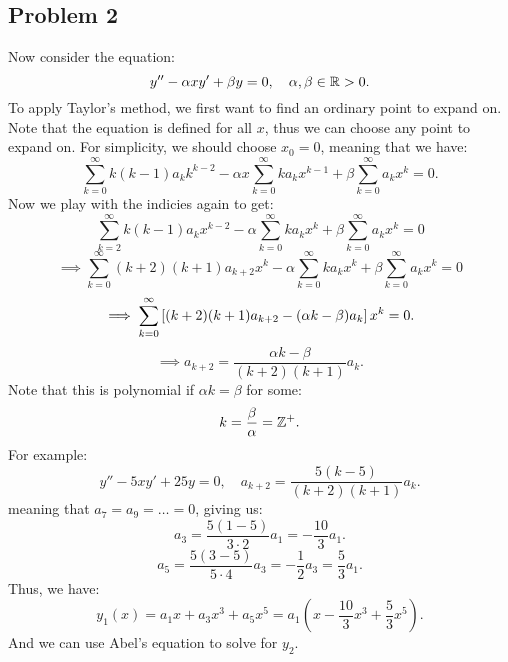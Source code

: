 \documentclass[../main/main.tex]{subfiles}
\begin{document}
\subsection{Problem 2}
Now consider the equation: \[
y'' - \alpha xy' + \beta y= 0,\quad \alpha, \beta \in  \mathbb{R}>0
.\] To apply Taylor's method, we first want to find an ordinary point to expand on. Note that the equation is defined for all $x$, thus we can choose any point to expand on. For simplicity, we should choose $x_0=0$, meaning that we have: \[
\sum_{k=0}^{\infty} k(k-1)a_k k^{k-2}-\alpha x \sum_{k=0}^{\infty} ka_kx^{k-1}+\beta \sum_{k=0}^{\infty} a_k x^{k}=0
.\] Now we play with the indicies again to get: \[
\sum_{k=2}^{\infty} k(k-1)a_kx^{k-2}-\alpha \sum_{k=0}^{\infty} ka_k x^{k} + \beta \sum_{k=0}^{\infty} a_k x^{k}
=0\] \[
\implies \sum_{k=0}^{\infty} (k+2)(k+1)a_{k+2}x^{k}-\alpha \sum_{k=0}^{\infty} ka_{k}x^{k} + \beta \sum_{k=0}^{\infty} a_kx^{k}=0
\]\[\implies\sum_{k=0}^{\infty} \LARGE\left[(k+2)(k+1)a_{k+2}-(\alpha k-\beta)a_k\right]x^{k}=0.\] \[
\implies a_{k+2}= \frac{\alpha k - \beta}{(k+2)(k+1)}a_{k}
.\] Note that this is polynomial if $\alpha k = \beta$ for some: \[
k=\frac{\beta}{\alpha}=\mathbb{Z}^{+}
.\] For example: \[
y'' -5xy' +25y = 0,\quad a_{k+2}= \frac{5(k-5)}{(k+2)(k+1)}a_k
.\] meaning that $a_7 = a_9 = \ldots =0$, giving us: \[
a_3 = \frac{5(1-5)}{3\cdot 2} a_1 = -\frac{10}{3}a_1
.\] \[
a_5 = \frac{5(3-5)}{5\cdot 4}a_3 = -\frac{1}{2}a_3 = \frac{5}{3}a_1
.\] Thus, we have: \[
y_1(x) = a_1 x + a_3 x^{3} + a_5 x^{5} = a_1 \left( x - \frac{10}{3}x^{3}+\frac{5}{3}x^{5} \right) 
.\] And we can use Abel's equation to solve for $y_2$.
\end{document}
